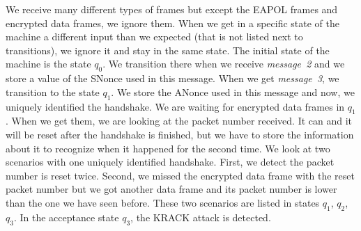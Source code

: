 We receive many different types of frames but except the EAPOL frames and encrypted data frames, we ignore them. When we get in a specific state of the machine a different input than we expected (that is not listed next to transitions), we ignore it and stay in the same state. The initial state of the machine is the state $q_0$. We transition there when we receive \textit{message~2} and we store a value of the SNonce used in this message. When we get \textit{message~3}, we transition to the state $q_1$. We store the ANonce used in this message and now, we uniquely identified the handshake. We are waiting for encrypted data frames in $q_1$. When we get them, we are looking at the packet number received. It can and it will be reset after the handshake is finished, but we have to store the information about it to recognize when it happened for the second time. We look at two scenarios with one uniquely identified handshake. First, we detect the packet number is reset twice. Second, we missed the encrypted data frame with the reset packet number but we got another data frame and its packet number is lower than the one we have seen before. These two scenarios are listed in states $q_1$, $q_2$, $q_3$. In the acceptance state $q_3$, the KRACK attack is detected.



